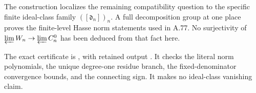 The construction localizes the remaining compatibility question
to the specific finite ideal-class family $([\mathfrak d_n])_n$.
A full decomposition group at one place proves the finite-level
Hasse norm statements used in A.77.  No surjectivity of
$\varprojlim W_n\to\varprojlim C_n^0$ has been deduced from
that fact here.

\noindent The exact certificate is
, with retained output
.
It checks the literal norm polynomials, the unique degree-one
residue branch, the fixed-denominator convergence bounds, and
the connecting sign.  It makes no ideal-class vanishing claim.
